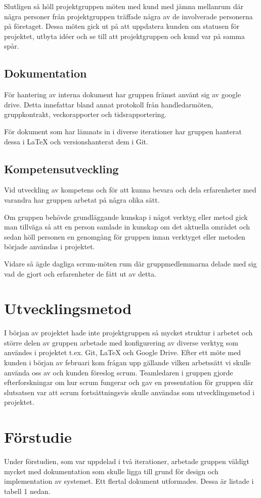Slutligen så höll projektgruppen möten med kund med jämna mellanrum där några personer från projektgruppen träffade några av de involverade personerna på företaget. Dessa möten gick ut på att uppdatera kunden om statusen för projektet, utbyta idéer och se till att projektgruppen och kund var på samma spår.

\subsection{Dokumentation}
För hantering av interna dokument har gruppen främst använt sig av google drive. Detta innefattar bland annat protokoll från handledarmöten, gruppkontrakt, veckorapporter och tidsrapportering.

För dokument som har lämnats in i diverse iterationer har gruppen hanterat dessa i LaTeX och versionshanterat dem i Git.

\subsection{Kompetensutveckling}
Vid utveckling av kompetens och för att kunna bevara och dela erfarenheter med varandra har gruppen arbetat på några olika sätt.

Om gruppen behövde grundläggande kunskap i något verktyg eller metod gick man tillväga så att en person samlade in kunskap om det aktuella området och sedan höll personen en genomgång för gruppen innan verktyget eller metoden började användas i projektet.

Vidare så ägde dagliga scrum-möten rum där gruppmedlemmarna delade med sig vad de gjort och erfarenheter de fått ut av detta.

\section{Utvecklingsmetod}
I början av projektet hade inte projektgruppen så mycket struktur i arbetet och större delen av gruppen arbetade med konfigurering av diverse verktyg som användes i projektet t.ex. Git, LaTeX och Google Drive.
Efter ett möte med kunden i början av februari kom frågan upp gällande vilken arbetssätt vi skulle använda oss av och kunden föreslog scrum. Teamledaren i gruppen gjorde efterforskningar om hur scrum fungerar och gav en presentation för gruppen där slutsatsen var att scrum fortsättningsvis skulle användas som utvecklingsmetod i projektet.

\section{Förstudie}
\label{sec:forstudie}
Under förstudien, som var uppdelad i två iterationer, arbetade gruppen väldigt mycket med dokumentation som skulle ligga till grund för design och implementation av systemet. Ett flertal dokument utformades. Dessa är listade i tabell 1 nedan.

